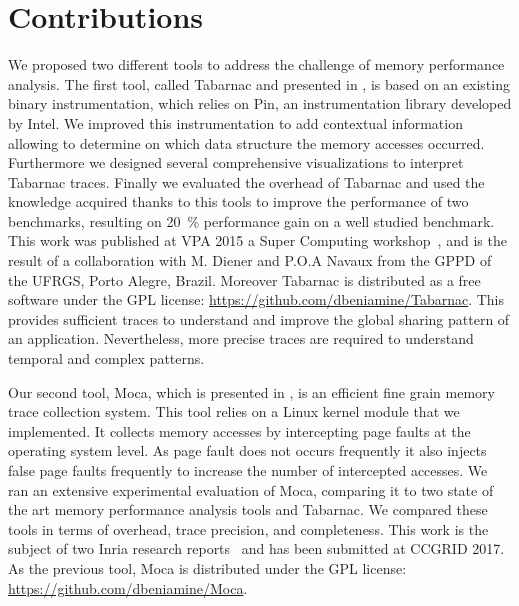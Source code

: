 \section{Contributions}

We proposed two different tools to address the challenge of memory performance analysis.
The first tool, called \gls{Tabarnac} and presented in , is based on an existing binary instrumentation, which relies on \gls{Pin}, an instrumentation library developed by \gls{Intel}.
We improved this instrumentation to add contextual information allowing to determine on which data structure the memory accesses occurred.
Furthermore we designed several comprehensive visualizations to interpret \gls{Tabarnac} traces.
Finally we evaluated the overhead of \gls{Tabarnac} and used the knowledge acquired thanks to this tools to improve the performance of two benchmarks, resulting on \SI{20}{\%} performance gain on a well studied benchmark.
This work was published at \gls{VPA} 2015 a Super Computing workshop~\cite{Beniamine15TABARNAC}, and is the result of a collaboration with M. Diener and P.O.A Navaux from the \gls{GPPD} of the \gls{UFRGS}, Porto Alegre, Brazil.
Moreover \gls{Tabarnac} is distributed as a free software under the \gls{GPL} license: \url{https://github.com/dbeniamine/Tabarnac}.
This provides sufficient traces to understand and improve the global sharing pattern of an application.
Nevertheless, more precise traces are required to understand temporal and complex patterns.

Our second tool, \gls{Moca}, which is presented in , is an efficient fine grain memory trace collection system.
This tool relies on a \gls{Linux} kernel module that we implemented.
It collects memory accesses by intercepting page faults at the operating system level.
As page fault does not occurs frequently it also injects false page faults frequently to increase the number of intercepted accesses.
We ran an extensive experimental evaluation of \gls{Moca}, comparing it to two state of the art memory performance analysis tools and \gls{Tabarnac}.
We compared these tools in terms of overhead, trace precision, and completeness.
This work is the subject of two Inria research reports~\cite{Beniamine15Memory,Beniamine16Moca} and has been submitted at \gls{CCGRID} 2017.
As the previous tool, \gls{Moca} is distributed under the \gls{GPL} license: \url{https://github.com/dbeniamine/Moca}.

